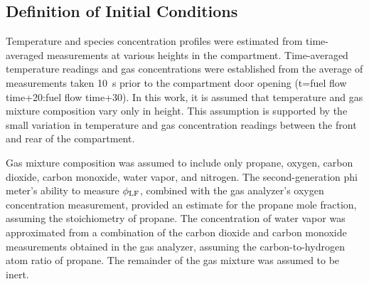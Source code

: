 \documentclass[12pt,letterpaper]{article}
\begin{document}
\begin{flushleft}
\subsection{Definition of Initial Conditions} \addvspace{10pt}
\label{sec:initcond}
Temperature and species concentration profiles were estimated from time-averaged measurements at various heights in the compartment. Time-averaged temperature readings and gas concentrations were established from the average of measurements taken 10~s prior to the compartment door opening (t=fuel flow time+20:fuel flow time+30). In this work, it is assumed that temperature and gas mixture composition vary only in height. This assumption is supported by the small variation in temperature and gas concentration readings between the front and rear of the compartment. 

Gas mixture composition was assumed to include only propane, oxygen, carbon dioxide, carbon monoxide, water vapor, and nitrogen. The second-generation phi meter's ability to measure $\phi_{\rm{LF}}$, combined with the gas analyzer's oxygen concentration measurement, provided an estimate for the propane mole fraction, assuming the stoichiometry of propane. The concentration of water vapor was approximated from a combination of the carbon dioxide and carbon monoxide measurements obtained in the gas analyzer, assuming the carbon-to-hydrogen atom ratio of propane. The remainder of the gas mixture was assumed to be inert.




\end{flushleft}
\end{document}
